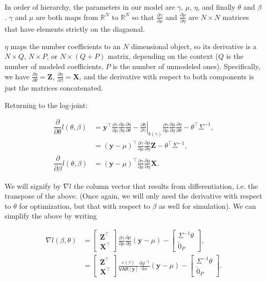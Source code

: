 \documentclass[10pt]{article}
\newcommand{\VAR}{\mathsf{VAR}}
\begin{document}
In order of hierarchy, the parameters in our model are $\gamma$,
$\mu$, $\eta$, and finally $\theta$ and $\beta$. $\gamma$ and $\mu$ are
both maps from $\mathbb{R}^N$ to $\mathbb{R}^N$ so that
$\frac{\partial\gamma}{\partial\mu}$ and
$\frac{\partial\mu}{\partial\eta}$ are $N\times N$ matrices that have
elements strictly on the diagaonal.

$\eta$ maps the number coefficients to an $N$ dimensional object, so its
derivative is a $N \times Q$, $N \times P$, or $N \times (Q + P)$ matrix,
depending on the context ($Q$ is the number of modeled coefficients,
$P$ is the number of unmodeled ones). Specifically, we have 
$\frac{\partial\eta}{\partial\theta} = \bm{Z}$,
$\frac{\partial\eta}{\partial\beta} = \bm{X}$, and the derivative with
respect to both components is just the matrices concatenated.

Returning to the log-joint:

\begin{align*}
\dfrac{\partial}{\partial \theta}l(\theta, \beta)  & =
\bm{y}^\top\frac{\partial\gamma}{\partial\mu}
\frac{\partial\mu}{\partial\eta}
\frac{\partial\eta}{\partial\theta}
- \left.\frac{\partial b}{\partial\gamma}\right|_{b(\gamma)}
\frac{\partial\gamma}{\partial\mu}
\frac{\partial\mu}{\partial\eta}
\frac{\partial\eta}{\partial\theta}
- \theta^\top\Sigma^{-1}, \\
& = (\bm{y} - \mu)^\top \frac{\partial\gamma}{\partial\mu}
\frac{\partial\mu}{\partial\eta} \bm{Z} - \theta^\top\Sigma^{-1}, \\
\dfrac{\partial}{\partial\beta}l(\theta, \beta) & = 
(\bm{y} - \mu)^\top \frac{\partial\gamma}{\partial\mu}
\frac{\partial\mu}{\partial\eta} \bm{X}.
\end{align*}

We will signify by $\nabla l$ the column vector that results from
differentiation, i.e. the transpose of the above. (Once again, we will
only need the derivative with respect to $\theta$ for optimization,
but that with respect to $\beta$ as well for simulation). We can simplify the above by writing

\begin{align*}
\nabla l(\beta, \theta) & =
\begin{bmatrix}
\bm{Z}^\top \\ \bm{X}^\top
\end{bmatrix}
\frac{\partial\gamma}{\partial\mu}
\frac{\partial\mu}{\partial\eta}
\left(\bm{y} -
  \mu\right) -
\begin{bmatrix}
\Sigma^{-1}\theta \\
\utilde{0}_P
\end{bmatrix}, \\
& = \begin{bmatrix}
\bm{Z}^\top \\ \bm{X}^\top
\end{bmatrix}
\frac{c(\tau)}{\VAR[\bm{y}]}
\frac{\mathrm{d} g^{-1}}{\mathrm{d}x}
\left(\bm{y} -
  \mu\right) -
\begin{bmatrix}
\Sigma^{-1}\theta \\
\utilde{0}_P
\end{bmatrix}.
\end{align*}
\end{document}
